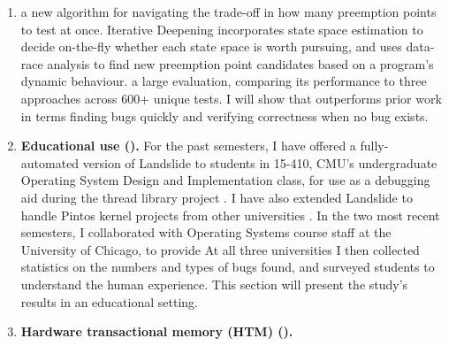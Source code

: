 \begin{enumerate}
	\item {}
		a new algorithm for navigating the trade-off in how many preemption points to test at once.
		Iterative Deepening incorporates state space estimation \cite{estimation}
		to decide on-the-fly whether each state space is worth pursuing,
		and uses data-race analysis \cite{tsan,fasttrack}
		to find new preemption point candidates based on a program's dynamic behaviour.
		a large evaluation, comparing its performance to three  approaches
		across 600+ unique tests.
		I will show that 
		outperforms prior work in terms  finding bugs quickly
		and verifying correctness when no bug exists.
	\item {\bf Educational use ().}
		For the past  semesters,
		I have offered a fully-automated version of Landslide to students in 15-410,
		CMU's undergraduate Operating System Design and Implementation class,
		for use as a debugging aid during the thread library project \cite{thrlib}.
		I have also extended Landslide to handle Pintos kernel projects from other universities \cite{pintos}.
		In the two most recent semesters, I collaborated with Operating Systems course staff at the University of Chicago,
		to provide
		At all three universities I then collected statistics on the numbers and types of bugs found,
		and surveyed students to understand the human experience.
		This section will present the study's results
		 in an educational setting.
	\item {\bf Hardware transactional memory (HTM) ().}

\end{enumerate}
